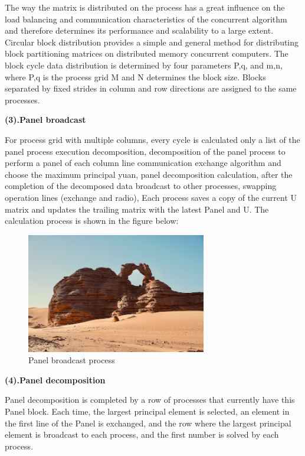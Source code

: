 \documentclass[a4paper,12pt]{article}
\begin{document}
The way the matrix is distributed on the process has a great influence on the load balancing and communication characteristics of the concurrent algorithm and therefore determines its performance and scalability to a large extent. Circular block distribution provides a simple and general method for distributing block partitioning matrices on distributed memory concurrent computers. The block cycle data distribution is determined by four parameters P,q, and m,n, where P,q is the process grid M and N determines the block size. Blocks separated by fixed strides in column and row directions are assigned to the same processes.

\textbf{(3).Panel broadcast}

For process grid with multiple columns, every cycle is calculated only a list of the panel process execution decomposition, decomposition of the panel process to perform a panel of each column line communication exchange algorithm and choose the maximum principal yuan, panel decomposition calculation, after the completion of the decomposed data broadcast to other processes, swapping operation lines (exchange and radio), Each process saves a copy of the current U matrix and updates the trailing matrix with the latest Panel and U. The calculation process is shown in the figure below:

\begin{figure}[H]
    \centering
    \includegraphics[width=0.7\textwidth]{Panel_broadcast_process.png}
    \caption{Panel broadcast process}
    \label{fig:panel_broadcast}
\end{figure}

\textbf{(4).Panel decomposition}

Panel decomposition is completed by a row of processes that currently have this Panel block. Each time, the largest principal element is selected, an element in the first line of the Panel is exchanged, and the row where the largest principal element is broadcast to each process, and the first number is solved by each process.
\end{document}
